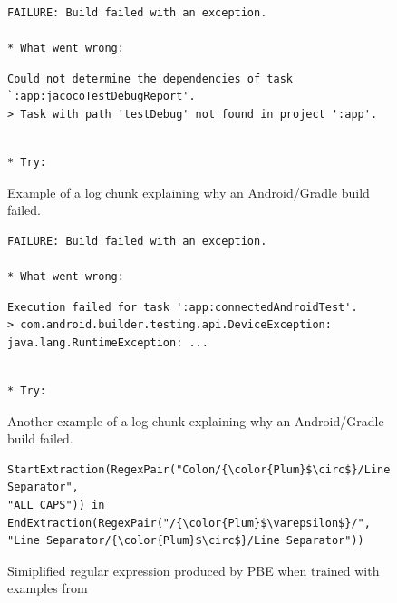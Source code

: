 \begin{figure}[!t]
  \centering
  \begin{lstlisting}[breaklines=true,frame=tlr]
FAILURE: Build failed with an exception.

* What went wrong:
  \end{lstlisting}
  \vspace{-\baselineskip}
  \begin{lstlisting}[backgroundcolor=\color{Cerulean!60},breaklines=true,frame=rl]
Could not determine the dependencies of task `:app:jacocoTestDebugReport'.
> Task with path 'testDebug' not found in project ':app'.
  \end{lstlisting}
  \vspace{-\baselineskip}
  \begin{lstlisting}[breaklines=true,frame=blr]

* Try:
  \end{lstlisting}
  \caption{Example of a log chunk explaining why an Android/Gradle
  build failed.}
  \label{lst:chunk-example-1}
\end{figure}

\begin{figure}[!t]
  \centering
  \begin{lstlisting}[breaklines=true,frame=tlr]
FAILURE: Build failed with an exception.

* What went wrong:
  \end{lstlisting}
  \vspace{-\baselineskip}
  \begin{lstlisting}[backgroundcolor=\color{Cerulean!60},breaklines=true,frame=rl]
Execution failed for task ':app:connectedAndroidTest'.
> com.android.builder.testing.api.DeviceException:
java.lang.RuntimeException: ...
  \end{lstlisting}
  \vspace{-\baselineskip}
  \begin{lstlisting}[breaklines=true,frame=blr]

* Try:
  \end{lstlisting}
  \caption{Another example of a log chunk explaining why an Android/Gradle
  build failed.}
  \label{lst:chunk-example-2}
\end{figure}

\begin{figure}[!t]
  \centering
  \begin{lstlisting}[breaklines=true]
StartExtraction(RegexPair("Colon/{\color{Plum}$\circ$}/Line Separator",
"ALL CAPS")) in EndExtraction(RegexPair("/{\color{Plum}$\varepsilon$}/",
"Line Separator/{\color{Plum}$\circ$}/Line Separator"))
  \end{lstlisting}
  \caption{Simiplified regular expression produced by PBE when trained
  with examples from }
  \label{lst:prose-program-simplified}
\end{figure}


